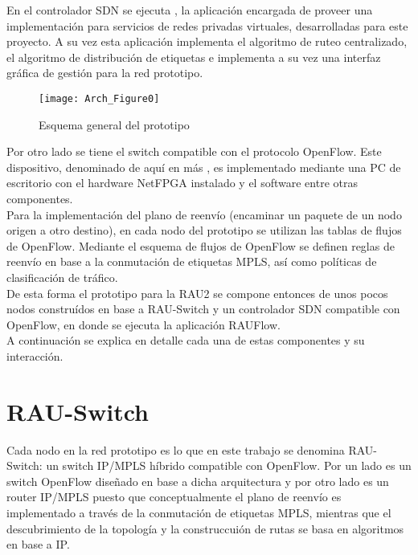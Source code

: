 En el controlador SDN se ejecuta , la aplicaci\'on encargada de proveer una implementaci\'on para servicios de redes privadas virtuales, desarrolladas para este proyecto. A su vez esta aplicaci\'on implementa el algoritmo de ruteo  centralizado, el algoritmo de distribución de etiquetas e implementa a su vez una interfaz gr\'afica de gesti\'on para la red prototipo.\\

\begin{figure}[h] 
\centering    
\texttt{[image: Arch\_Figure0]}
\caption[Esquema general del prototipo]{Esquema general del prototipo}
\label{fig:OpenSourceRArch0}
\end{figure}

Por otro lado se tiene el switch compatible con el protocolo OpenFlow. Este dispositivo, denominado de aqu\'i en m\'as , es implementado mediante una PC de escritorio con el hardware NetFPGA instalado y el software  entre otras componentes.\\ 

Para la implementaci\'on del plano de reenvío (encaminar un paquete de un nodo origen a otro destino), en cada nodo del prototipo se utilizan las tablas de flujos de OpenFlow. Mediante el esquema de flujos de OpenFlow se definen reglas de reenv\'io en base a la conmutaci\'on de etiquetas MPLS, as\'i como pol\'iticas de clasificaci\'on de tr\'afico.\\

De esta forma el prototipo para la RAU2 se compone entonces de unos pocos nodos constru\'idos en base a RAU-Switch y un controlador SDN compatible con OpenFlow, en donde se ejecuta la aplicaci\'on RAUFlow.\\

A continuaci\'on se explica en detalle cada una de estas componentes y su interacci\'on.

\section{RAU-Switch}
Cada nodo en la red prototipo es lo que en este trabajo se denomina RAU-Switch: un switch IP/MPLS h\'ibrido compatible con OpenFlow. Por un lado es un switch OpenFlow dise\~nado en base a dicha arquitectura y por otro lado es un router IP/MPLS puesto que conceptualmente el plano de reenvío es implementado a trav\'es de la conmutación de etiquetas MPLS, mientras que el descubrimiento de la topolog\'ia y la construccui\'on de rutas se basa en algoritmos en base a IP.\\

